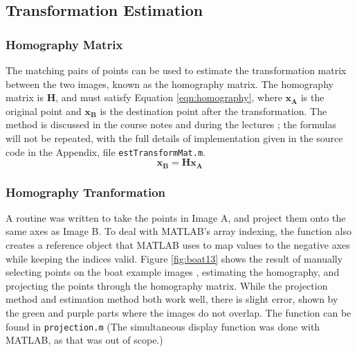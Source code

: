 \documentclass[a4paper, 10pt, conference]{ieeeconf}
\begin{document}
\subsection{Transformation Estimation}

\subsubsection{Homography Matrix}
The matching pairs of points can be used to estimate the transformation matrix between the two images, known as the homography matrix. The homography matrix is \textbf{H}, and must satisfy Equation \ref{eqn:homography}, where $\textbf{x}_\textbf{A}$ is the original point and $\textbf{x}_\textbf{B}$ is the destination point after the transformation. The method is discussed in the course notes and during the lectures \cite{notes}; the formulas will not be repeated, with the full details of implementation given in the source code in the Appendix, file \texttt{estTransformMat.m}.
\vspace{-0.15cm}
\begin{equation} \label{eqn:homography}
    \textbf{x}_\textbf{B} = \textbf{Hx}_\textbf{A}
\end{equation}
\vspace{-0.5cm}

\subsubsection{Homography Tranformation}
A routine was written to take the points in Image A, and project them onto the same axes as Image B. To deal with MATLAB's array indexing, the function also creates a reference object that MATLAB uses to map values to the negative axes while keeping the indices valid. Figure \ref{fig:boat13} shows the result of manually selecting points on the boat example images \cite{boat}, estimating the homography, and projecting the points through the homography matrix. While the projection method and estimation method both work well, there is slight error, shown by the green and purple parts where the images do not overlap. The function can be found in \texttt{projection.m} (The simultaneous display function was done with MATLAB, as that was out of scope.)
\end{document}
